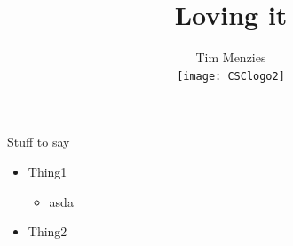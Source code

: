\documentclass[14pt]{beamer}
\author[Tim Menzies]{Tim Menzies\\\vspace{10mm}\texttt{[image: CSClogo2]}}
\title{Loving it}
\institute{Com Sci, NcState, USA}
\begin{document}
\begin{frame}
\titlepage
\end{frame}


\begin{frame}{Stuff to say}

\begin{itemize}
\item Thing1
\begin{itemize}
\item asda
\end{itemize}
\item Thing2
\end{itemize}
\end{frame}
\end{document}
